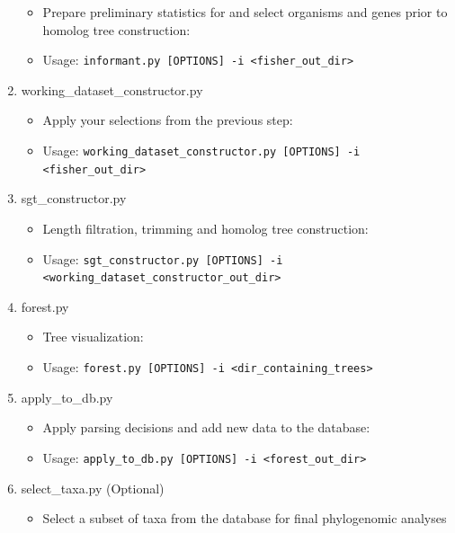 \documentclass{article}
\def\code#1{\texttt{#1}}
\begin{document}
\begin{enumerate}[itemsep=12pt]
                \begin{itemize}[noitemsep,topsep=0pt]
                    \item Prepare preliminary statistics for and select organisms and genes prior to homolog tree construction:
                    \item Usage: \code{informant.py [OPTIONS] -i <fisher\_out\_dir>}
                \end{itemize}
            \item working\_dataset\_constructor.py
                \begin{itemize}[noitemsep,topsep=0pt]
                    \item Apply your selections from the previous step:
                    \item Usage: \code{working\_dataset\_constructor.py [OPTIONS] -i <fisher\_out\_dir>} 
                \end{itemize}
            \item sgt\_constructor.py
                \begin{itemize}[noitemsep,topsep=0pt]
                    \item Length filtration, trimming and homolog tree construction:
                    \item Usage: \code{sgt\_constructor.py [OPTIONS] -i <working\_dataset\_constructor\_out\_dir>}
                \end{itemize}
            \item forest.py
            \begin{itemize}[noitemsep,topsep=0pt]
                \item Tree visualization:
                \item Usage: \code{forest.py [OPTIONS] -i <dir\_containing\_trees>}
            \end{itemize}
            \item apply\_to\_db.py
                \begin{itemize}[noitemsep,topsep=0pt]
                    \item Apply parsing decisions and add new data to the database:
                    \item Usage: \code{apply\_to\_db.py [OPTIONS] -i <forest\_out\_dir>}
                \end{itemize}
            \item select\_taxa.py (Optional)
                \begin{itemize}[noitemsep,topsep=0pt]
                    \item Select a subset of taxa from the database for final phylogenomic analyses

\end{itemize}
\end{enumerate}
\end{document}

